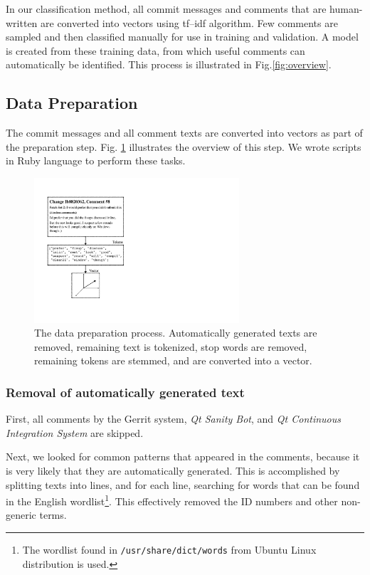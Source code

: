 \documentclass[conference]{IEEEtran}
\begin{document}
In our classification method,
all commit messages and comments that are human-written are converted into vectors using tf--idf algorithm.
Few comments are sampled and then classified manually for use in training and validation.
A model is created from these training data, from which useful comments can automatically be identified.
This process is illustrated in Fig.\ref{fig:overview}.

\subsection{Data Preparation}

The commit messages and all comment texts are converted into vectors as part of the preparation step.
Fig. \ref{fig:preprocess} illustrates the overview of this step.
We wrote scripts in Ruby language to perform these tasks.

\begin{figure}[h]
\centering
\includegraphics[width=3in]{preprocess}
\caption{The data preparation process.
Automatically generated texts are removed, remaining text is tokenized, stop words are removed, remaining tokens are stemmed,
and are converted into a vector.}
\label{fig:preprocess}
\end{figure}

\subsubsection{Removal of automatically generated text}

First, all comments by the Gerrit system, \emph{Qt Sanity Bot}, and \emph{Qt Continuous Integration System} are skipped.

Next, we looked for common patterns that appeared in the comments, because it is very likely that they are automatically generated.
This is accomplished by splitting texts into lines, and for each line, searching for words that can be found in the English wordlist\footnote{The wordlist found in \texttt{/usr/share/dict/words} from Ubuntu Linux distribution is used.}.
This effectively removed the ID numbers and other non-generic terms.
\end{document}
